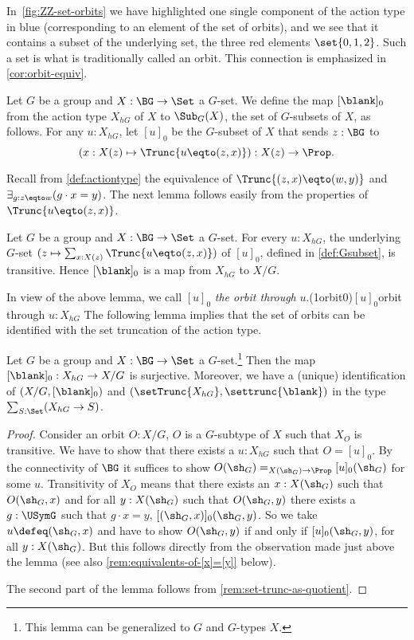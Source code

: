 In~\cref{fig:ZZ-set-orbits} we have highlighted one single component of
the action type in blue (\ie corresponding to an element of the set of orbits),
and we see that it contains a subset of the underlying set,
the three red elements $\set{0,1,2}$.
Such a set is what is traditionally called an orbit.
This connection is emphasized in \cref{cor:orbit-equiv}.

\begin{definition}\label{def:orbit-map}
Let $G$ be a group and $X : \BG\to\Set$ a $G$-set.
We define the map $[\blank]_0$ from the action type $X_{hG}$ of
$X$ to $\Sub_G(X)$, the set of $G$-subsets of $X$, as follows.
For any $u:X_{hG}$, let $[u]_0$ be the $G$-subset of $X$ that
sends $z:\BG$ to
\[
(x:X(z) \mapsto \Trunc{u\eqto(z,x)}) : X(z) \to \Prop.\qedhere
\]
\end{definition}

Recall from \cref{def:actiontype} the equivalence of
$\Trunc{(z,x)\eqto(w,y)}$ and $\exists_{g:z\eqto w}(g\cdot x = y)$.
The next lemma follows easily from the properties of $\Trunc{u\eqto(z,x)}$.

\begin{lemma}\label{lem:[]0-maps-to-X/G}
Let $G$ be a group and $X : \BG\to\Set$ a $G$-set.
For every $u:X_{hG}$, the underlying $G$-set
$(z\mapsto \sum_{x:X(z)}\Trunc{u\eqto(z,x)})$ of $[u]_0$,
defined in \cref{def:Gsubset}, is transitive.
Hence $[\blank]_0$ is a map from $X_{hG}$ to $X/G$.
\end{lemma}

In view of the above lemma, we call $[u]_0$ \emph{the orbit
through} $u$.\glossary(1orbit0){$[u]_0$}{orbit through $u:X_{hG}$}
The following lemma implies that the set of orbits can 
be identified with the set truncation of the action type.

\begin{lemma}\label{lem:X/G=setTruncX_hG}
  Let $G$ be a group and $X : \BG\to\Set$ a $G$-set.\footnote{%
  This lemma can be generalized to \inftygps $G$ and $G$-types $X$.}
  Then the map $[\blank]_0 :X_{hG}\to X/G $ is surjective.
  Moreover, we have a (unique) identification of
  $(X/G,[\blank]_0)$ and $(\setTrunc{X_{hG}},\settrunc{\blank})$
  in the type $\sum_{S:\Set}(X_{hG}\to S)$.
\end{lemma}

\begin{proof}
  Consider an orbit $O:X/G$, \ie
  $O$ is a $G$-subtype of $X$ such that $X_O$ is transitive. 
  We have to show that there exists a $u:X_{hG}$ such that $O=[u]_0$.
  By the connectivity of $\BG$ it suffices to show 
  $O(\sh_G)=_{X(\sh_G)\to\Prop}[u]_0(\sh_G)$ for some $u$.
  Transitivity of $X_O$ means that there exists an $x:X(\sh_G)$
  such that $O(\sh_G,x)$ and for all $y:X(\sh_G)$ such that
  $O(\sh_G,y)$ there
  exists a $g:\USymG$ such that $g\cdot x = y$, \ie $[(\sh_G,x)]_0(\sh_G,y)$.
  So we take $u\defeq(\sh_G,x)$ and have to show $O(\sh_G,y)$ if and only if
  $[u]_0(\sh_G,y)$, for all $y:X(\sh_G)$. But this follows directly from
  the observation made just above the lemma
  (see also \cref{rem:equivalents-of-[x]=[y]} below).
  
  The second part of the lemma follows from \cref{rem:set-trunc-as-quotient}. 
\end{proof}


